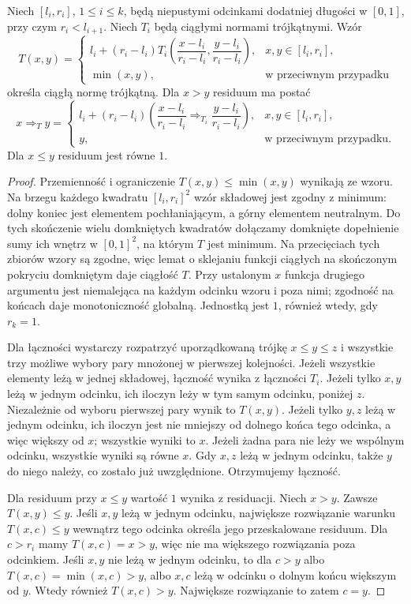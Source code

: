 \begin{lemat}
\label{lem:lst-fuzzy-finite-ordinal-tnorm}
Niech $[l_i,r_i]$, $1\leq i\leq k$, będą niepustymi
odcinkami dodatniej długości w $[0,1]$, przy czym
$r_i<l_{i+1}$. Niech $T_i$ będą ciągłymi normami
trójkątnymi. Wzór
\[
 T(x,y)=
 \begin{cases}
 l_i+(r_i-l_i)T_i\left(
 \dfrac{x-l_i}{r_i-l_i},\dfrac{y-l_i}{r_i-l_i}\right),
 &x,y\in[l_i,r_i],\\
 \min(x,y),&\text{w przeciwnym przypadku}
 \end{cases}
\]
określa ciągłą normę trójkątną.
Dla $x>y$ residuum ma postać
\[
 x\Rightarrow_T y=
 \begin{cases}
 l_i+(r_i-l_i)
 \left(\dfrac{x-l_i}{r_i-l_i}
 \Rightarrow_{T_i}\dfrac{y-l_i}{r_i-l_i}\right),
 &x,y\in[l_i,r_i],\\
 y,&\text{w przeciwnym przypadku}.
 \end{cases}
\]
Dla $x\leq y$ residuum jest równe $1$.
\end{lemat}
\begin{proof}
Przemienność i ograniczenie $T(x,y)\leq\min(x,y)$
wynikają ze wzoru. Na brzegu każdego kwadratu
$[l_i,r_i]^2$ wzór składowej jest zgodny z minimum:
dolny koniec jest elementem pochłaniającym,
a górny elementem neutralnym. Do tych skończenie wielu domkniętych kwadratów
dołączamy domknięte dopełnienie sumy ich wnętrz
w $[0,1]^2$, na którym $T$ jest minimum. Na przecięciach
tych zbiorów wzory są zgodne, więc lemat o sklejaniu
funkcji ciągłych na skończonym pokryciu domkniętym
daje ciągłość $T$.
Przy ustalonym $x$ funkcja drugiego argumentu jest
niemalejąca na każdym odcinku wzoru i poza nimi;
zgodność na końcach daje monotoniczność globalną.
Jednostką jest $1$, również wtedy, gdy $r_k=1$.

Dla łączności wystarczy rozpatrzyć uporządkowaną
trójkę $x\leq y\leq z$ i wszystkie trzy możliwe
wybory pary mnożonej w pierwszej kolejności.
Jeżeli wszystkie elementy leżą w jednej składowej,
łączność wynika z łączności $T_i$.
Jeżeli tylko $x,y$ leżą w jednym odcinku, ich
iloczyn leży w tym samym odcinku, poniżej $z$.
Niezależnie od wyboru pierwszej pary wynik to $T(x,y)$.
Jeżeli tylko $y,z$ leżą w jednym odcinku, ich iloczyn
jest nie mniejszy od dolnego końca tego odcinka,
a więc większy od $x$; wszystkie wyniki to $x$.
Jeżeli żadna para nie leży we wspólnym odcinku,
wszystkie wyniki są równe $x$. Gdy $x,z$ leżą
w jednym odcinku, także $y$ do niego należy, co
zostało już uwzględnione. Otrzymujemy łączność.

Dla residuum przy $x\leq y$ wartość $1$ wynika
z residuacji. Niech $x>y$. Zawsze $T(x,y)\leq y$.
Jeśli $x,y$ leżą w jednym odcinku, największe
rozwiązanie warunku $T(x,c)\leq y$ wewnątrz tego
odcinka określa jego przeskalowane residuum.
Dla $c>r_i$ mamy $T(x,c)=x>y$, więc nie ma
większego rozwiązania poza odcinkiem.
Jeśli $x,y$ nie leżą w jednym odcinku, to dla
$c>y$ albo $T(x,c)=\min(x,c)>y$, albo $x,c$ leżą
w odcinku o dolnym końcu większym od $y$.
Wtedy również $T(x,c)>y$. Największe rozwiązanie
to zatem $c=y$.
\end{proof}

